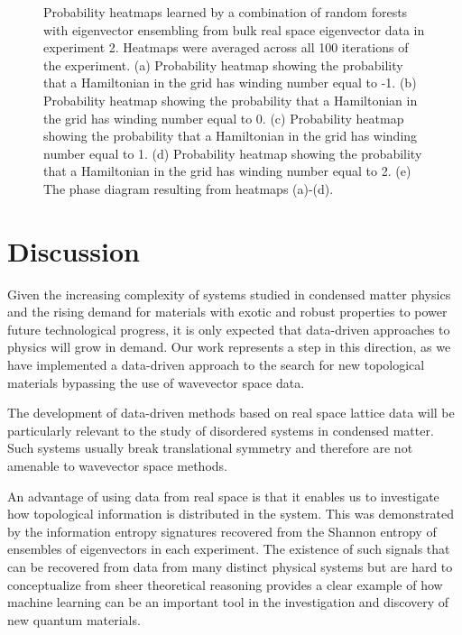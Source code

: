 \documentclass[10pt]{revtex4-1}
\begin{document}
\begin{figure}
\caption{Probability heatmaps learned by a combination of random forests with eigenvector ensembling from bulk real space eigenvector data in experiment 2. Heatmaps were averaged across all 100 iterations of the experiment. (a) Probability heatmap showing the probability that a Hamiltonian in the grid has winding number equal to -1.  (b) Probability heatmap showing the probability that a Hamiltonian in the grid has winding number equal to 0. (c) Probability heatmap showing the probability that a Hamiltonian in the grid has winding number equal to 1. (d) Probability heatmap showing the probability that a Hamiltonian in the grid has winding number equal to 2. (e) The phase diagram resulting from heatmaps (a)-(d).}
\label{ssh2_heatmaps}
\end{figure}

\section*{Discussion}

Given the increasing complexity of systems studied in condensed matter physics and the rising demand for materials with exotic and robust properties to power future technological progress, it is only expected that data-driven approaches to physics will grow in demand. Our work represents a step in this direction, as we have implemented a data-driven approach to the search for new topological materials bypassing the use of wavevector space data.

The development of data-driven methods based on real space lattice data will be particularly relevant to the study of disordered systems in condensed matter. Such systems usually break translational symmetry and therefore are not amenable to wavevector space methods.

An advantage of using data from real space is that it enables us to investigate how topological information is distributed in the system. This was demonstrated by the information entropy signatures recovered from the Shannon entropy of ensembles of eigenvectors in each experiment. The existence of such signals that can be recovered from data from many distinct physical systems but are hard to conceptualize from sheer theoretical reasoning provides a clear example of how machine learning can be an important tool in the investigation and discovery of new quantum materials.
\end{document}
